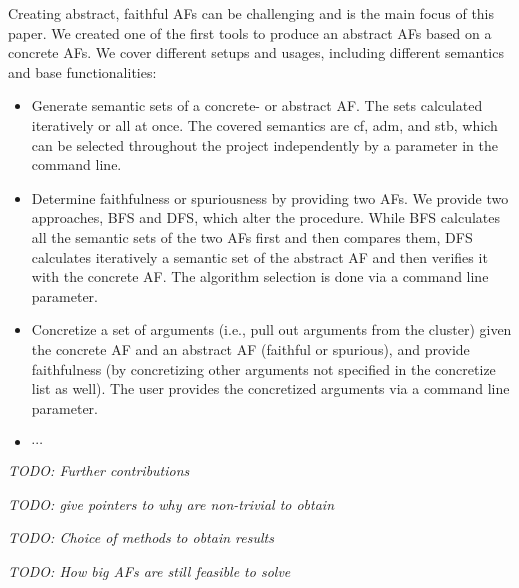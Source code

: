 Creating abstract, faithful \acp{AF} can be challenging and is the main focus of this paper. We created one of the first tools \cite{Pasero2024-AFClustering-Repo} to produce an abstract \acp{AF} based on a concrete \acp{AF}. We cover different setups and usages, including different semantics and base functionalities:

\begin{itemize}
    \item Generate semantic sets of a concrete- or abstract \ac{AF}. The sets calculated iteratively or all at once. The covered semantics are \ac{cf}, \ac{adm}, and \ac{stb}, which can be selected throughout the project independently by a parameter in the command line.

    \item Determine faithfulness or spuriousness by providing two \acp{AF}. We provide two approaches, \ac{BFS} and \ac{DFS}, which alter the procedure. While \ac{BFS} calculates all the semantic sets of the two \acp{AF} first and then compares them, \ac{DFS} calculates iteratively a semantic set of the abstract \ac{AF} and then verifies it with the concrete \ac{AF}. The algorithm selection is done via a command line parameter.

    \item Concretize a set of arguments (i.e., pull out arguments from the cluster) given the concrete \ac{AF} and an abstract \ac{AF} (faithful or spurious), and provide faithfulness (by concretizing other arguments not specified in the concretize list as well). The user provides the concretized arguments via a command line parameter.

    \item $\cdots$
\end{itemize}

\noindent

\textit{TODO: Further contributions}

\textit{TODO: give pointers to why are non-trivial to obtain}

\textit{TODO: Choice of methods to obtain results}

\textit{TODO: How big AFs are still feasible to solve}
